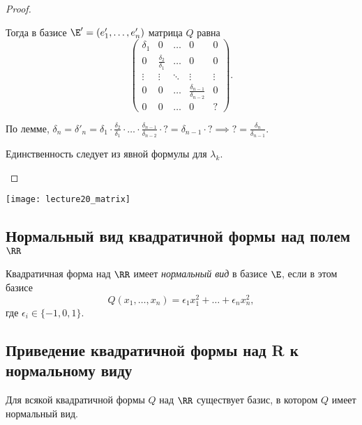 \begin{proof}
\begin{description}
        Тогда в базисе $\E' = (e'_1, \dots, e'_n)$ матрица $Q$ равна
        \begin{equation*}
            \begin{pmatrix} 
                \delta_1 & 0 & \dots & 0 & 0 \\
                0 & \frac{\delta_2}{\delta_1} & \dots & 0 & 0 \\
                \vdots & \vdots & \ddots & \vdots & \vdots \\
                0 & 0 & \dots & \frac{\delta_{n - 1}}{\delta_{n - 2}} & 0 \\
                0 & 0 & \dots & 0 & ?
            \end{pmatrix}
        .\end{equation*}

        По лемме, $\delta_n = \delta'_n = \delta_1 \cdot \frac{\delta_2}{\delta_1} \cdot \dots \cdot \frac{\delta_{n - 1}}{\delta_{n - 2}} \cdot ? = \delta_{n - 1} \cdot ? \implies ? = \frac{\delta_n}{\delta_{n - 1}}$.

        Единственность следует из явной формулы для $\lambda_k$.
        \qedhere
    \end{description}
\end{proof}

\begin{center}
    \texttt{[image: lecture20\_matrix]}
\end{center}


\subsection{Нормальный вид квадратичной формы над полем $\RR$}

\begin{definition}
    Квадратичная форма над $\RR$ имеет \textit{нормальный вид} в базисе $\E$, если в этом базисе
    \begin{equation*}
        Q(x_1, \dots, x_n) = \epsilon_1 x_1^2 + \dots + \epsilon_n x_n^2
    ,\end{equation*}
    где $\epsilon_i \in \{-1, 0, 1\}$.
\end{definition}


\subsection{Приведение квадратичной формы над R к нормальному виду}

\begin{corollary}
    Для всякой квадратичной формы $Q$ над $\RR$ существует базис, в котором $Q$ имеет нормальный вид.
\end{corollary}

